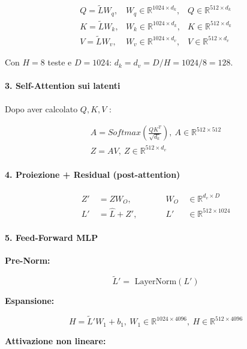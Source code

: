 \documentclass[
  11pt,
]{article}
\begin{document}
\[\begin{matrix}
Q = \widetilde{L}W_{q}, & W_{q} \in \mathbb{R}^{1024 \times d_k}, & Q \in \mathbb{R}^{512 \times d_k} \\
K = \widetilde{L}W_{k}, & W_{k} \in \mathbb{R}^{1024 \times d_k}, & K \in \mathbb{R}^{512 \times d_k} \\
V = \widetilde{L}W_{v}, & W_{v} \in \mathbb{R}^{1024 \times d_v}, & V \in \mathbb{R}^{512 \times d_v}
\end{matrix}\]

Con $H=8$ teste e $D=1024$: $d_k = d_v = D/H = 1024/8 = 128$.

\paragraph{3. \textbf{Self-Attention sui latenti}}

Dopo aver calcolato \(Q,K,V\) :

\[\begin{matrix}
A = Softmax\left( \frac{QK^{T}}{\sqrt{d_k}} \right),\ A \in \mathbb{R}^{512 \times 512} \\
Z = AV,\ Z \in \mathbb{R}^{512 \times d_v}
\end{matrix}\]

\paragraph{4. \textbf{Proiezione + Residual (post-attention)}}

\[\begin{matrix}
Z' & \  = ZW_{O}, & \ \ \ \ \ \ \ \  & W_{O} & \  \in \mathbb{R}^{d_v \times D} \\
L' & \  = \widehat{L} + Z', & \ \ \ \ \ \ \ \  & L' & \  \in \mathbb{R}^{512 \times 1024}
\end{matrix}\]

\paragraph{5. \textbf{Feed-Forward MLP}}

\textbf{Pre-Norm:}

\[{\widetilde{L}}' = \text{ LayerNorm}\left( L' \right)\]

\textbf{Espansione:}

\[H = {\widetilde{L}}'W_{1} + b_{1},\ W_{1} \in \mathbb{R}^{1024 \times 4096},\ H \in \mathbb{R}^{512 \times 4096}\]

\textbf{Attivazione non lineare:}
\end{document}
